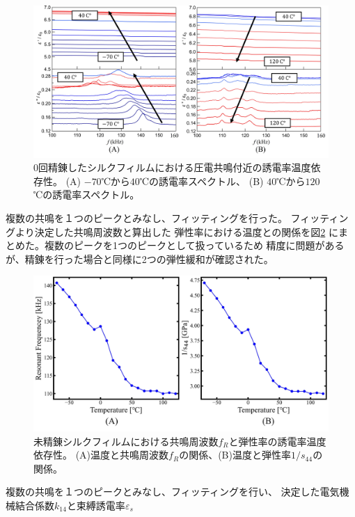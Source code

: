 \documentclass[dvipdfmx,12pt,a4paper]{jreport}
\begin{document}
			\begin{figure}[h]
				\centering
				\includegraphics[width=\linewidth]{0回_誘電率温度依存性_圧電共鳴付近.jpg}
				\caption{0回精錬したシルクフィルムにおける圧電共鳴付近の誘電率温度依存性。
				(A) $-70$℃から$40$℃の誘電率スペクトル、
				(B) $40$℃から$120$℃の誘電率スペクトル。}
				\label{0回誘電率温度依存性_拡大図}
			\end{figure}
			複数の共鳴を１つのピークとみなし、フィッティングを行った。
			フィッティングより決定した共鳴周波数と算出した
			弾性率における温度との関係を図\ref{0回_共鳴周波数_弾性率_温度依存性}
			にまとめた。複数のピークを1つのピークとして扱っているため
			精度に問題があるが、精錬を行った場合と同様に2つの弾性緩和が確認された。
			\begin{figure}[H]
				\centering
				\includegraphics[width=\linewidth]{0回_共鳴周波数_弾性率_温度依存性.jpg}
				\caption{未精錬シルクフィルムにおける共鳴周波数$f_R$と弾性率の誘電率温度依存性。
				(A)温度と共鳴周波数$f_R$の関係、(B)温度と弾性率$1/s_{44}$の関係。}
				\label{0回_共鳴周波数_弾性率_温度依存性}
			\end{figure}
			\newpage
			複数の共鳴を１つのピークとみなし、フィッティングを行い、
			決定した電気機械結合係数$k_{14}$と束縛誘電率$\varepsilon_s$
\end{document}
